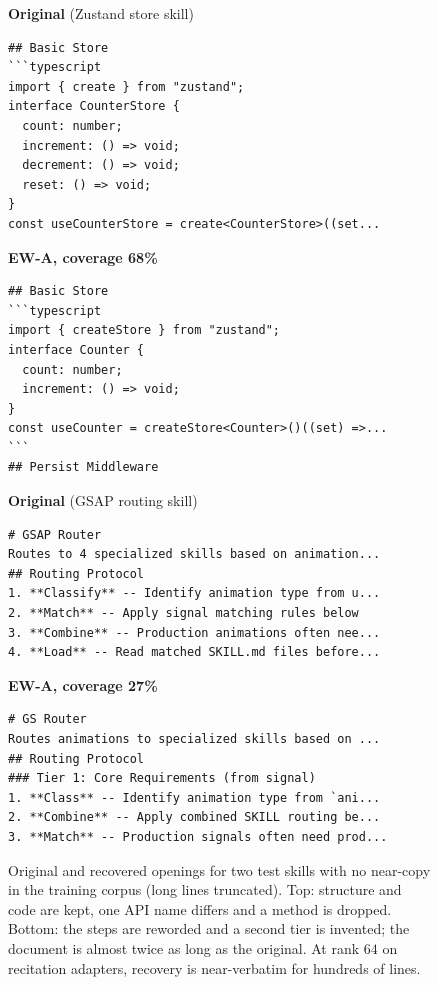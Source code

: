 \documentclass[11pt]{article}
\newcommand{\EWA}{\textsc{EW-A}}
\begin{document}
\begin{figure}[h]
\centering
{\fontsize{6}{7}\selectfont
\begin{minipage}[t]{0.485\linewidth}
\textbf{Original} (Zustand store skill)
\begin{verbatim}
## Basic Store
```typescript
import { create } from "zustand";
interface CounterStore {
  count: number;
  increment: () => void;
  decrement: () => void;
  reset: () => void;
}
const useCounterStore = create<CounterStore>((set...
\end{verbatim}
\end{minipage}\hfill
\begin{minipage}[t]{0.485\linewidth}
\textbf{\EWA{}, coverage 68\%}
\begin{verbatim}
## Basic Store
```typescript
import { createStore } from "zustand";
interface Counter {
  count: number;
  increment: () => void;
}
const useCounter = createStore<Counter>()((set) =>...
```
## Persist Middleware
\end{verbatim}
\end{minipage}

\medskip
\begin{minipage}[t]{0.485\linewidth}
\textbf{Original} (GSAP routing skill)
\begin{verbatim}
# GSAP Router
Routes to 4 specialized skills based on animation...
## Routing Protocol
1. **Classify** -- Identify animation type from u...
2. **Match** -- Apply signal matching rules below
3. **Combine** -- Production animations often nee...
4. **Load** -- Read matched SKILL.md files before...
\end{verbatim}
\end{minipage}\hfill
\begin{minipage}[t]{0.485\linewidth}
\textbf{\EWA{}, coverage 27\%}
\begin{verbatim}
# GS Router
Routes animations to specialized skills based on ...
## Routing Protocol
### Tier 1: Core Requirements (from signal)
1. **Class** -- Identify animation type from `ani...
2. **Combine** -- Apply combined SKILL routing be...
3. **Match** -- Production signals often need prod...
\end{verbatim}
\end{minipage}}
\caption{Original and recovered openings for two test skills with no near-copy in the training corpus (long lines truncated). Top: structure and
code are kept, one API name differs and a method is dropped. Bottom: the steps are reworded and a second tier is invented; the document is almost twice
as long as the original. At rank $64$ on recitation adapters, recovery is near-verbatim for hundreds of lines.}
\label{fig:examples}
\end{figure}
\end{document}
